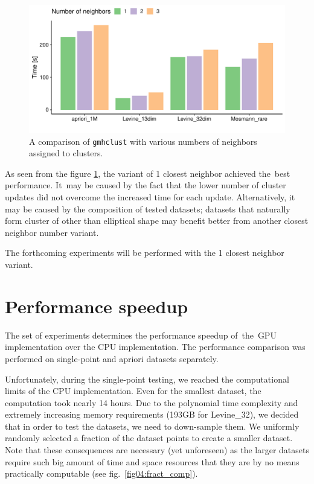 \begin{figure}\centering
	\includegraphics[width=\linewidth]{img/neighbor_compare}
	\caption{A comparison of \texttt{gmhclust} with various numbers of neighbors assigned to clusters.}
	\label{fig04:neigh}
\end{figure}

As  seen from the figure \ref{fig04:neigh}, the variant of 1 closest neighbor achieved the~best performance. It\ may be caused by the fact that the lower number of cluster updates did not overcome the increased time for each update. Alternatively, it may be caused by the composition of tested datasets; datasets that naturally form cluster of other than elliptical shape may benefit better from another closest neighbor number variant.

The forthcoming experiments will be performed with the 1 closest neighbor variant.

\section{Performance speedup}

The  set of experiments determines the performance speedup of~the~GPU implementation over the CPU implementation. The performance comparison was performed on single-point and apriori datasets separately.

Unfortunately, during the single-point testing, we reached the computational limits of the CPU implementation. Even for the smallest dataset, the computation took nearly 14 hours. Due to the polynomial time complexity and extremely increasing memory requirements (193GB for Levine\_32), we decided that in order to test the datasets, we need to down-sample them. We uniformly randomly selected a fraction of the dataset points to create a smaller dataset. Note that these consequences are necessary (yet unforeseen) as the larger datasets require such big amount of time and space resources that they are by no means practically computable (see fig.~\ref{fig04:fract_comp}).

